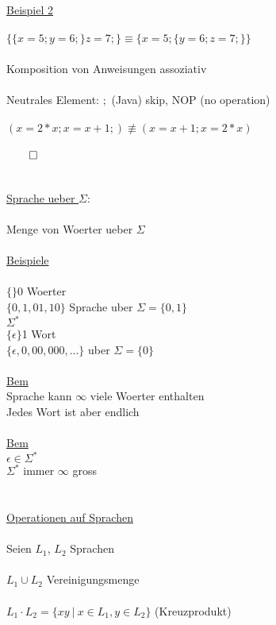 \documentclass[18pt,a4paper]{scrreprt}
\newcommand{\tab}{\hspace*{2em}}
\begin{document}
\uline{Beispiel 2}\\
\\
$\{\{ x =5; y = 6;\} z =7;\} \equiv \{x =5; \{y =6; z=7;\}\}$\\
\\
Komposition von Anweisungen assoziativ\\
\\
Neutrales Element: $;$ (Java) skip, NOP (no operation)\\
\\
$(x = 2*x; x = x+1;) \not\equiv (x = x+1; x = 2*x)$\\
\\
$\qed$\\
\\
\\
\uline{Sprache ueber $\Sigma$}:\\
\\
Menge von Woerter ueber $\Sigma$\\
\\
\uline{Beispiele}\\
\\
$\{\}$\tab 0 Woerter\\
$\{0,1,01,10\}$ Sprache uber $\Sigma = \{0,1\}$\\
$\Sigma^*$\\
$\{\epsilon\}$\tab 1 Wort\\
$\{\epsilon, 0, 00, 000, ...\}$ uber $\Sigma = \{0\}$\\
\\
\uline{Bem}\\
Sprache kann $\infty$ viele Woerter enthalten\\
Jedes Wort ist aber endlich\\
\\
\uline{Bem}\\
$\epsilon \in \Sigma^*$\\
$\Sigma^*$ immer $\infty$ gross\\
\\
\\
\uline{Operationen auf Sprachen}\\
\\
Seien $L_1$, $L_2$ Sprachen\\
\\
$L_1\cup L_2$ Vereinigungsmenge\\
\\
$L_1 \cdot L_2 = \{ xy \:\vert\: x \in L_1, y \in L_2\}$ (Kreuzprodukt)\\
\\
\\
\end{document}
